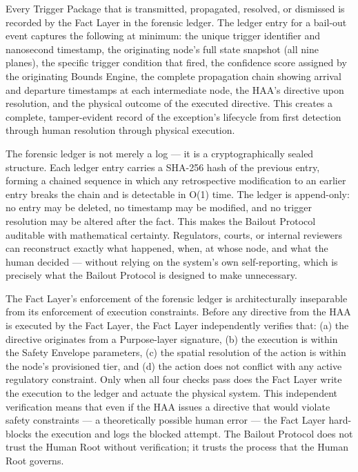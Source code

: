 Every Trigger Package that is transmitted, propagated, resolved, or dismissed is recorded by the Fact Layer in the forensic ledger. The ledger entry for a bail-out event captures the following at minimum: the unique trigger identifier and nanosecond timestamp, the originating node's full state snapshot (all nine planes), the specific trigger condition that fired, the confidence score assigned by the originating Bounds Engine, the complete propagation chain showing arrival and departure timestamps at each intermediate node, the HAA's directive upon resolution, and the physical outcome of the executed directive. This creates a complete, tamper-evident record of the exception's lifecycle from first detection through human resolution through physical execution.

The forensic ledger is not merely a log — it is a cryptographically sealed structure. Each ledger entry carries a SHA-256 hash of the previous entry, forming a chained sequence in which any retrospective modification to an earlier entry breaks the chain and is detectable in O(1) time. The ledger is append-only: no entry may be deleted, no timestamp may be modified, and no trigger resolution may be altered after the fact. This makes the Bailout Protocol auditable with mathematical certainty. Regulators, courts, or internal reviewers can reconstruct exactly what happened, when, at whose node, and what the human decided — without relying on the system's own self-reporting, which is precisely what the Bailout Protocol is designed to make unnecessary.

The Fact Layer's enforcement of the forensic ledger is architecturally inseparable from its enforcement of execution constraints. Before any directive from the HAA is executed by the Fact Layer, the Fact Layer independently verifies that: (a) the directive originates from a Purpose-layer signature, (b) the execution is within the Safety Envelope parameters, (c) the spatial resolution of the action is within the node's provisioned tier, and (d) the action does not conflict with any active regulatory constraint. Only when all four checks pass does the Fact Layer write the execution to the ledger and actuate the physical system. This independent verification means that even if the HAA issues a directive that would violate safety constraints — a theoretically possible human error — the Fact Layer hard-blocks the execution and logs the blocked attempt. The Bailout Protocol does not trust the Human Root without verification; it trusts the process that the Human Root governs.

